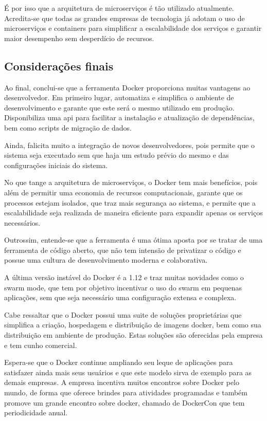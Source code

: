 \documentclass[
	12pt,				%
	openright,			%
	oneside,			%
	a4paper,			%
	chapter=TITLE,		%
	section=TITLE,		%
	english,			%
	french,				%
	spanish,			%
	brazil				%
	]{abntex2}
\begin{document}
É por isso que a arquitetura de microserviços é tão utilizado atualmente. Acredita-se que todas as grandes empresas de tecnologia já adotam o uso de microserviços e containers para simplificar a escalabilidade dos serviços e garantir maior desempenho sem desperdício de recursos.

\subsection{Considerações finais}

Ao final, conclui-se que a ferramenta Docker proporciona muitas vantagens ao desenvolvedor. Em primeiro lugar, automatiza e simplifica o ambiente de desenvolvimento e garante que este será o mesmo utilizado em produção. Disponibiliza uma api para facilitar a instalação e atualização de dependências, bem como scripts de migração de dados.

Ainda, falicita muito a integração de novos desenvolvedores, pois permite que o sistema seja executado sem que haja um estudo prévio do mesmo e das configurações iniciais do sistema.

No que tange a arquitetura de microserviços, o Docker tem mais benefícios, pois além de permitir uma economia de recursos computacionais, garante que os processos estejam isolados, que traz mais segurança ao sistema, e permite que a escalabilidade seja realizada de maneira eficiente para expandir apenas os serviços necessários.

Outrossim, entende-se que a ferramenta é uma ótima aposta por se tratar de uma ferramenta de código aberto, que não tem intensão de privatizar o código e possue uma cultura de desenvolvimento moderna e colaborativa.

A última versão instável do Docker é a 1.12 e traz muitas novidades como o swarm mode, que tem por objetivo incentivar o uso do swarm em pequenas aplicações, sem que seja necessário uma configuração extensa e complexa.

Cabe ressaltar que o Docker possui uma suite de soluções proprietárias que simplifica a criação, hospedagem e distribuição de imagens docker, bem como sua distribuição em ambiente de produção. Estas soluções são oferecidas pela empresa e tem cunho comercial.

Espera-se que o Docker continue ampliando seu leque de aplicações para satisfazer ainda mais seus usuários e que este modelo sirva de exemplo para as demais empresas. A empresa incentiva muitos encontros sobre Docker pelo mundo, de forma que oferece brindes para atividades programadas e também promove um grande encontro sobre docker, chamado de DockerCon que tem periodicidade anual.
\end{document}

